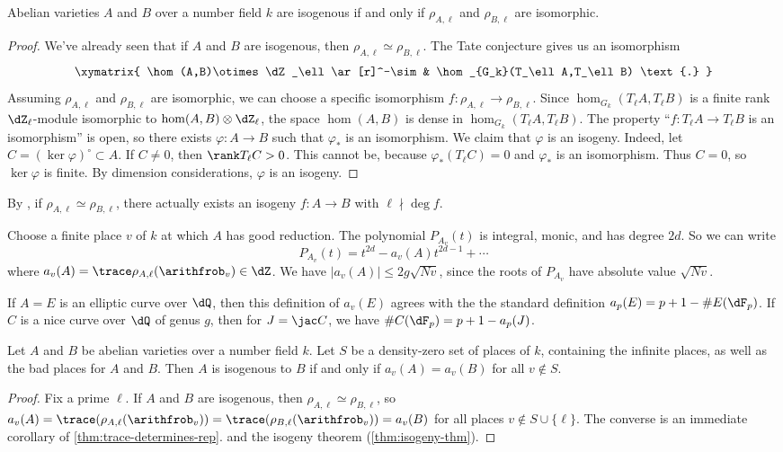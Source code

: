 \begin{corollary}\label{thm:isogeny-thm}
Abelian varieties $A$ and $B$ over a number field $k$ are isogenous if and only 
if $\rho_{A,\ell}$ and $\rho_{B,\ell}$ are isomorphic. 
\end{corollary}
\begin{proof}
We've already seen that if $A$ and $B$ are isogenous, then 
$\rho_{A,\ell}\simeq \rho_{B,\ell}$. The Tate conjecture gives us an 
isomorphism 
\[\xymatrix{
  \hom(A,B)\otimes\dZ_\ell \ar[r]^-\sim 
    & \hom_{G_k}(T_\ell A,T_\ell B) \text{.}
}\]
Assuming $\rho_{A,\ell}$ and $\rho_{B,\ell}$ are isomorphic, we can choose 
a specific isomorphism $f:\rho_{A,\ell}\to \rho_{B,\ell}$. Since 
$\hom_{G_k}(T_\ell A,T_\ell B)$ is a finite rank $\dZ_\ell$-module isomorphic 
to $\hom(A,B)\otimes \dZ_\ell$, the space $\hom(A,B)$ is dense in 
$\hom_{G_k}(T_\ell A,T_\ell B)$. The property ``$f:T_\ell A\to T_\ell B$ is an 
isomorphism'' is open, so there exists $\varphi:A\to B$ such that 
$\varphi_\ast$ is an isomorphism. We claim that $\varphi$ is an isogeny. 
Indeed, let $C=(\ker\varphi)^\circ\subset A$. If $C\ne 0$, then 
$\rank T_\ell C > 0$. This cannot be, because $\varphi_\ast(T_\ell C) = 0$ and 
$\varphi_\ast$ is an isomorphism. Thus $C=0$, so $\ker \varphi$ is finite. By 
dimension considerations, $\varphi$ is an isogeny. 
\end{proof}
By \cite[V.3.2]{fa84}, if $\rho_{A,\ell}\simeq \rho_{B,\ell}$, there actually 
exists an isogeny $f:A\to B$ with $\ell\nmid \deg f$. 

Choose a finite place $v$ of $k$ at which $A$ has good reduction. The 
polynomial $P_{A_v}(t)$ is integral, monic, and has degree $2 d$. So we can 
write 
\[
  P_{A_v}(t) = t^{2 d} - a_v(A) t^{2 d-1} + \cdots 
\]
where $a_v(A)=\trace\rho_{A,\ell}(\arithfrob_v)\in \dZ$. We have 
$|a_v(A)|\leqslant 2 g \sqrt{N v}$, since the roots of $P_{A_v}$ have 
absolute value $\sqrt{N v}$. 

If $A=E$ is an elliptic curve over $\dQ$, then this definition of $a_v(E)$ 
agrees with the the standard definition $a_p(E)=p+1-\# E(\dF_p)$. If 
$C$ is a nice curve over $\dQ$ of genus $g$, then for 
$J=\jac C$, we have $\# C(\dF_p) = p+1-a_p(J)$. 

\begin{theorem}
Let $A$ and $B$ be abelian varieties over a number field $k$. Let $S$ be a 
density-zero set of places of $k$, containing the infinite places, as well as 
the bad places for $A$ and $B$. Then $A$ is isogenous to $B$ if and only if 
$a_v(A)=a_v(B)$ for all $v\notin S$. 
\end{theorem}
\begin{proof}
Fix a prime $\ell$. If $A$ and $B$ are isogenous, then 
$\rho_{A,\ell}\simeq \rho_{B,\ell}$, so 
$a_v(A)=\trace(\rho_{A,\ell}(\arithfrob_v))=\trace(\rho_{B,\ell}(\arithfrob_v))=a_v(B)$ 
for all places $v\notin S\cup\{\ell\}$. The converse is an immediate corollary 
of \ref{thm:trace-determines-rep}. and the isogeny theorem 
(\ref{thm:isogeny-thm}). 
\end{proof}

